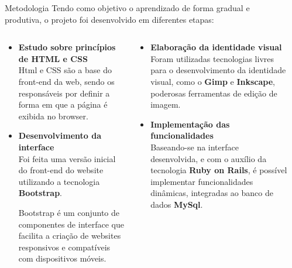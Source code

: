 \documentclass[final]{beamer} %
\begin{document}
\begin{frame}[t]
\begin{columns}[t]
\begin{column}{0.28\paperwidth}
  \end{column}
  \begin{column}{0.60\paperwidth} %
	\begin{block}{Metodologia}
		Tendo como objetivo o aprendizado de forma gradual e produtiva, o projeto foi desenvolvido em diferentes etapas:
		\begin{columns}[t,totalwidth=0.60\paperwidth]
			\begin{column}{0.28\paperwidth}
			\begin{itemize}
		    	\item {\bf Estudo sobre princípios de HTML e CSS}\\
					Html e CSS são a base do front-end da web, sendo os responsáveis por definir a forma em que a página é exibida no browser.
				\item {\bf Desenvolvimento da interface}\\
					Foi feita uma versão inicial do front-end do website utilizando a tecnologia \textbf{Bootstrap}.
					
					Bootstrap é um conjunto de componentes de interface que facilita a criação de websites responsivos e compatíveis com dispositivos móveis.
			\end{itemize}
			\end{column}
			\begin{column}{0.28\paperwidth}
				\begin{itemize}
					\item {\bf Elaboração da identidade visual}\\
						Foram utilizadas tecnologias livres para o desenvolvimento da identidade visual, como o \textbf{Gimp} e \textbf{Inkscape}, poderosas ferramentas de edição de imagem.
					\item {\bf Implementação das funcionalidades}\\
						Baseando-se na interface desenvolvida, e com o auxílio da tecnologia \textbf{Ruby on Rails}, é possível implementar funcionalidades dinâmicas, integradas ao banco de dados \textbf{MySql}.
				\end{itemize}
			\end{column}
		\end{columns}
		   		

\end{block}
\end{column}
\end{columns}
\end{frame}
\end{document}
